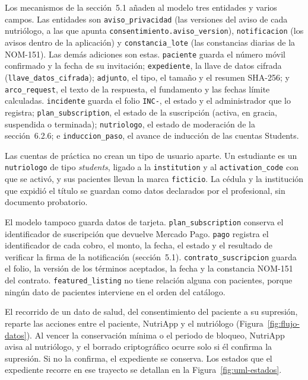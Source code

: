\documentclass[12pt, a4paper]{article}
\begin{document}
Los mecanismos de la sección~5.1 añaden al modelo tres entidades y
varios campos. Las entidades son \texttt{aviso\_privacidad} (las
versiones del aviso de cada nutriólogo, a las que apunta
\texttt{consentimiento.aviso\_version}), \texttt{notificacion} (los
avisos dentro de la aplicación) y \texttt{constancia\_lote} (las
constancias diarias de la NOM-151). Las demás adiciones son estas.
\texttt{paciente} guarda el número móvil confirmado y la fecha de su
invitación; \texttt{expediente}, la llave de datos cifrada
(\texttt{llave\_datos\_cifrada}); \texttt{adjunto}, el tipo, el tamaño y
el resumen SHA-256; y \texttt{arco\_request}, el texto de la respuesta,
el fundamento y las fechas límite calculadas. \texttt{incidente} guarda
el folio \texttt{INC-}, el estado y el administrador que lo registra;
\texttt{plan\_subscription}, el estado de la suscripción (activa, en
gracia, suspendida o terminada); \texttt{nutriologo}, el estado de
moderación de la sección~6.2.6; e \texttt{induccion\_paso}, el avance de
inducción de las cuentas Students.
 
Las cuentas de práctica no crean un tipo de usuario aparte. Un
estudiante es un \texttt{nutriologo} de tipo \textit{students}, ligado a
la \texttt{institution} y al \texttt{activation\_code} con que se
activó, y sus pacientes llevan la marca \texttt{ficticio}. La cédula y
la institución que expidió el título se guardan como datos declarados
por el profesional, sin documento probatorio.

El modelo tampoco guarda datos de tarjeta. \texttt{plan\_subscription}
conserva el identificador de suscripción que devuelve Mercado Pago.
\texttt{pago} registra el identificador de cada cobro, el monto, la
fecha, el estado y el resultado de verificar la firma de la notificación
(sección~5.1). \texttt{contrato\_suscripcion} guarda el folio, la
versión de los términos aceptados, la fecha y la constancia NOM-151 del
contrato. \texttt{featured\_listing} no tiene relación alguna con
pacientes, porque ningún dato de pacientes interviene en el orden del
catálogo.
 
El recorrido de un dato de salud, del consentimiento del paciente a su
supresión, reparte las acciones entre el paciente, NutriApp y el
nutriólogo (Figura~\ref{fig:flujo-datos}). Al vencer la conservación
mínima o el periodo de bloqueo, NutriApp avisa al nutriólogo, y el
borrado criptográfico ocurre solo si él confirma la supresión. Si no la
confirma, el expediente se conserva. Los estados que el expediente
recorre en ese trayecto se detallan en la Figura~\ref{fig:uml-estados}.
 
\end{document}
